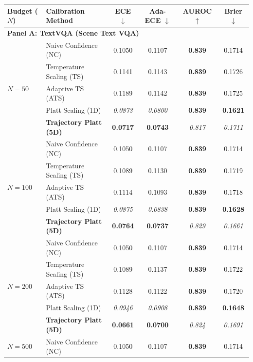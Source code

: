 \begin{table}[t]
\setlength{\tabcolsep}{3pt}
\renewcommand{\arraystretch}{0.88}
\centering
\scriptsize
\begin{tabular}{llcccc}
\toprule
\textbf{Budget ($N$)} & \textbf{Calibration Method} & \textbf{ECE} $\downarrow$ & \textbf{Ada-ECE} $\downarrow$ & \textbf{AUROC} $\uparrow$ & \textbf{Brier} $\downarrow$ \\
\midrule
\multicolumn{6}{l}{\textbf{Panel A: TextVQA (Scene Text VQA)}} \\
\midrule
\multirow{5}{*}{$N = 50$} & Naive Confidence (NC) & 0.1050 & 0.1107 & \textbf{0.839} & 0.1714 \\
 & Temperature Scaling (TS) & 0.1141 & 0.1143 & \textbf{0.839} & 0.1726 \\
 & Adaptive TS (ATS) & 0.1189 & 0.1142 & \textbf{0.839} & 0.1725 \\
 & Platt Scaling (1D) & \textit{0.0873} & \textit{0.0800} & \textbf{0.839} & \textbf{0.1621} \\
 & \textbf{Trajectory Platt (5D)} & \textbf{0.0717} & \textbf{0.0743} & \textit{0.817} & \textit{0.1711} \\
\midrule
\multirow{5}{*}{$N = 100$} & Naive Confidence (NC) & 0.1050 & 0.1107 & \textbf{0.839} & 0.1714 \\
 & Temperature Scaling (TS) & 0.1089 & 0.1130 & \textbf{0.839} & 0.1719 \\
 & Adaptive TS (ATS) & 0.1114 & 0.1093 & \textbf{0.839} & 0.1718 \\
 & Platt Scaling (1D) & \textit{0.0875} & \textit{0.0838} & \textbf{0.839} & \textbf{0.1628} \\
 & \textbf{Trajectory Platt (5D)} & \textbf{0.0764} & \textbf{0.0737} & \textit{0.829} & \textit{0.1661} \\
\midrule
\multirow{5}{*}{$N = 200$} & Naive Confidence (NC) & 0.1050 & 0.1107 & \textbf{0.839} & 0.1714 \\
 & Temperature Scaling (TS) & 0.1089 & 0.1137 & \textbf{0.839} & 0.1722 \\
 & Adaptive TS (ATS) & 0.1128 & 0.1122 & \textbf{0.839} & 0.1720 \\
 & Platt Scaling (1D) & \textit{0.0946} & \textit{0.0908} & \textbf{0.839} & \textbf{0.1648} \\
 & \textbf{Trajectory Platt (5D)} & \textbf{0.0661} & \textbf{0.0700} & \textit{0.824} & \textit{0.1691} \\
\midrule
\multirow{5}{*}{$N = 500$} & Naive Confidence (NC) & 0.1050 & 0.1107 & \textbf{0.839} & 0.1714 \\

\end{tabular}
\end{table}
